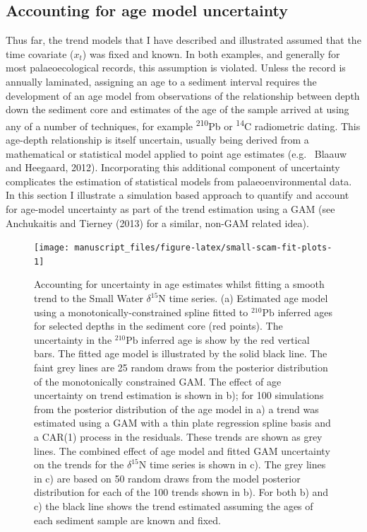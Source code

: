 \documentclass[12pt,]{article}
\begin{document}
\subsection{Accounting for age model
uncertainty}\label{accounting-for-age-model-uncertainty}

Thus far, the trend models that I have described and illustrated assumed
that the time covariate (\(x_t\)) was fixed and known. In both examples,
and generally for most palaeoecological records, this assumption is
violated. Unless the record is annually laminated, assigning an age to a
sediment interval requires the development of an age model from
observations of the relationship between depth down the sediment core
and estimates of the age of the sample arrived at using any of a number
of techniques, for example \textsuperscript{210}Pb or
\textsuperscript{14}C radiometric dating. This age-depth relationship is
itself uncertain, usually being derived from a mathematical or
statistical model applied to point age estimates (e.g.~ Blaauw and
Heegaard, 2012). Incorporating this additional component of uncertainty
complicates the estimation of statistical models from
palaeoenvironmental data. In this section I illustrate a simulation
based approach to quantify and account for age-model uncertainty as part
of the trend estimation using a GAM (see Anchukaitis and Tierney (2013)
for a similar, non-GAM related idea).

\begin{figure}

{\centering \texttt{[image: manuscript\_files/figure-latex/small-scam-fit-plots-1]} 

}

\caption{Accounting for uncertainty in age estimates whilst fitting a smooth trend to the Small Water $\delta^{15}\text{N}$ time series. (a) Estimated age model using a monotonically-constrained spline fitted to ${}^{210}\text{Pb}$ inferred ages for selected depths in the sediment core (red points). The uncertainty in the ${}^{210}\text{Pb}$ inferred age is show by the red vertical bars. The fitted age model is illustrated by the solid black line. The faint grey lines are 25 random draws from the posterior distribution of the monotonically constrained GAM. The effect of age uncertainty on trend estimation is shown in b); for 100 simulations from the posterior distribution of the age model in a) a trend was estimated using a GAM with a thin plate regression spline basis and a CAR(1) process in the residuals. These trends are shown as grey lines. The combined effect of age model and fitted GAM uncertainty on the trends for the $\delta^{15}\text{N}$ time series is shown in c). The grey lines in c) are based on 50 random draws from the model posterior distribution for each of the 100 trends shown in b). For both b) and c) the black line shows the trend estimated assuming the ages of each sediment sample are known and fixed.}\label{fig:small-scam-fit-plots}
\end{figure}
\end{document}
